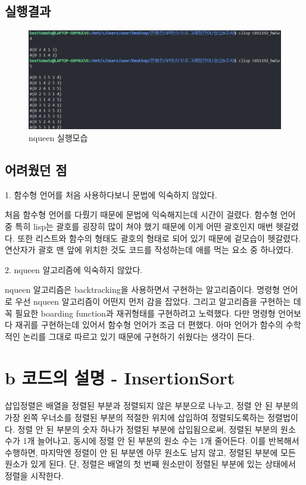 \documentclass{article}
\begin{document}
\subsection{실행결과}
\begin{figure}[h]
    \centering
    \includegraphics[scale = 0.7]{nqueenpic.png}
    \caption{nqueen 실행모습}
\end{figure}

\subsection{어려웠던 점}
1. 함수형 언어를 처음 사용하다보니 문법에 익숙하지 않았다.

처음 함수형 언어를 다뤘기 때문에 문법에 익숙해지는데 시간이 걸렸다. 함수형 언어 중 특히 lisp는 괄호를 굉장히 많이 쳐야 했기 때문에 이게 어떤 괄호인지 매번 헷갈렸다. 또한 리스트와 함수의 형태도 괄호의 형태로 되어 있기 때문에 겉모습이 헷갈렸다. 연산자가 괄호 맨 앞에 위치한 것도 코드를 작성하는데 애를 먹는 요소 중 하나였다.

2. nqueen 알고리즘에 익숙하지 않았다.

nqueen 알고리즘은 backtracking을 사용하면서 구현하는 알고리즘이다. 명령형 언어로 우선 nqueen 알고리즘이 어떤지 먼저 감을 잡았다. 그리고 알고리즘을 구현하는 데 꼭 필요한 boarding function과 재귀형태를 구현하려고 노력했다. 다만 명령형 언어보다 재귀를 구현하는데 있어서 함수형 언어가 조금 더 편했다. 아마 언어가 함수의 수학적인 논리를 그대로 따르고 있기 때문에 구현하기 쉬웠다는 생각이 든다.

\newpage
\section{b 코드의 설명 - InsertionSort}
삽입정렬은 배열을 정렬된 부분과 정렬되지 않은 부분으로 나누고, 정렬 안 된 부분의 가장 왼쪽 우너소를 정렬된 부분의 적절한 위치에 삽입하여 정렬되도록하는 정렬법이다. 정렬 안 된 부분의 숫자 하나가 정렬된 부분에 삽입됨으로써, 정렬된 부분의 원소 수가 1개 늘어나고, 동시에 정렬 안 된 부분의 원소 수는 1개 줄어든다. 
이를 반복해서 수행하면, 마지막엔 정렬이 안 된 부분엔 아무 원소도 남지 않고, 정렬된 부분에 모든 원소가 있게 된다. 단, 정렬은 배열의 첫 번째 원소만이 정렬된 부분에 있는 상태에서 정렬을 시작한다.
\end{document}
